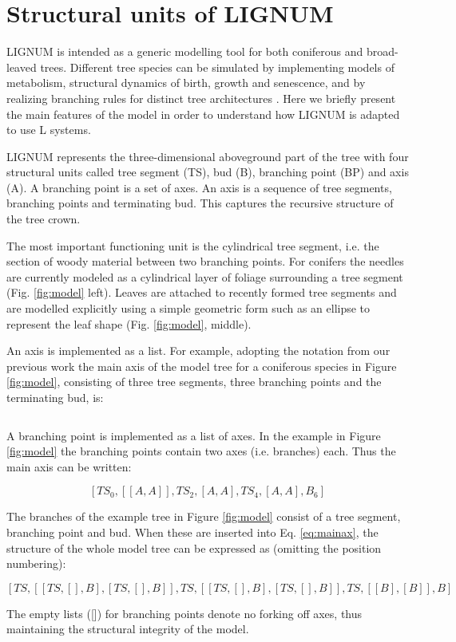 \section{Structural units  of LIGNUM} LIGNUM is intended  as a generic
modelling tool for both  coniferous and broad-leaved trees.  Different
tree species  can be simulated  by implementing models  of metabolism,
structural dynamics of birth,  growth and senescence, and by realizing
branching rules  for distinct tree  architectures \citep{perttunen:96,
perttunen:01}.  Here we briefly present the main features of the model
in order to understand how LIGNUM is adapted to use L systems.

LIGNUM represents  the three-dimensional aboveground part  of the tree
with  four  structural  units  called  tree  segment  (TS),  bud  (B),
branching point  (BP) and  axis (A).   A branching point  is a  set of
axes. An  axis is  a sequence of  tree segments, branching  points and
terminating bud.   This captures the  recursive structure of  the tree
crown.

The most  important functioning unit is the  cylindrical tree segment,
i.e. the section of woody  material between two branching points.  For
conifers the needles  are currently modeled as a  cylindrical layer of
foliage  surrounding  a  tree  segment (Fig.   \ref{fig:model}  left).
Leaves are attached to recently  formed tree segments and are modelled
explicitly  using  a simple  geometric  form  such  as an  ellipse  to
represent the leaf shape (Fig. \ref{fig:model}, middle).

An axis is  implemented as a list. For  example, adopting the notation
from our previous work \citep{perttunen:96} the main axis of the model
tree for a coniferous species in Figure \ref{fig:model}, consisting of
three tree  segments, three branching points and  the terminating bud,
is:

\begin{equation}
[TS_0,BP_1,TS_2,BP_3,TS_4,BP_5,B_6]
\end{equation}

A branching point is implemented as  a list of axes. In the example in
Figure   \ref{fig:model}  the  branching   points  contain   two  axes
(i.e. branches) each. Thus the main axis can be written:

\begin{equation}\label{eq:mainax}
[TS_0,[[A,A]],TS_2,[A,A],TS_4,[A,A],B_6]
\end{equation}

The branches of the example  tree in Figure \ref{fig:model} consist of
a tree segment, branching point  and bud. When these are inserted into
Eq.  \ref{eq:mainax}, the  structure of  the whole  model tree  can be
expressed as (omitting the position numbering):

\begin{equation}\label{eq:tree}
[TS,[[TS,[],B],[TS,[],B]],TS,[[TS,[],B],[TS,[],B]],TS,[[B],[B]],B]
\end{equation}

The empty lists ([]) for  branching points denote no forking off axes,
thus maintaining the structural integrity of the model.

